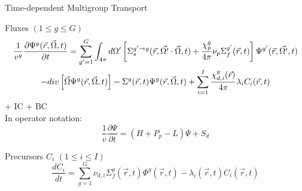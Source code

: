 \documentclass[8pt]{beamer}
\newcommand{\be}{\begin{equation}}
\newcommand{\ee}{\end{equation}}
\begin{document}
\begin{frame}{Time-dependent Multigroup Transport}


\begin{block}{Fluxes $(1 \le g \le G )$}
\begin{multline}
\frac{1}{v^g}\frac{\partial \Psi^g ( \vec{r},\vec{\Omega },t) }{\partial t} 
=
\sum_{g^\prime=1}^{G} \int\nolimits_{4\pi }d\Omega ^{\prime }
\left[
\Sigma _{s}^{g^\prime\to g}(\vec{r},\vec{\Omega ^{\prime }} \cdot \vec{\Omega },t)
+ 
\frac{\chi _{p}^g}{4\pi } \nu_{p}\Sigma ^{g^\prime}_{f}(\vec{r},t)
\right]
\Psi^{g^\prime} ( \vec{r},\vec{\Omega ^{\prime }},t)  \\
% 
-div\left[ \vec{\Omega }\Psi ^g ( \vec{r},\vec{\Omega },t) \right]
-\Sigma ^g(\vec{r},t)\Psi ^g( \vec{r},\vec{\Omega },t) 
%
+\sum\limits_{i=1}^{I} \frac{\chi ^g _{d,i}(\vec{r})}{4\pi} \lambda _{i}C_{i}(\vec{r},t)  \notag 
\end{multline}
+ IC + BC \\
\medskip
In operator notation:
\begin{equation*}
\boxed{
\frac{1}{v}\frac{\partial \Psi }{\partial t} = (H + P_p - L) \Psi  + S_{d} 
}
\end{equation*}
\end{block}

\vspace{-4mm}

\begin{block}{Precursors $C_i$ $(1 \le i \le I)$}
\begin{equation*}
\boxed{
\frac{dC_i}{dt} = \sum_{g=1}^G \nu_{d,i} \Sigma_f^g(\vec{r},t) \Phi^{g}(\vec{r},t) - \lambda_i(\vec{r},t) C_i(\vec{r},t) 
}
\end{equation*}
\end{block}

\end{frame}
%
%
\end{document}
